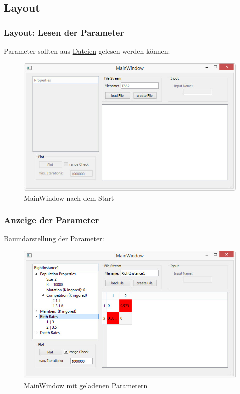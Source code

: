 \documentclass{beamer}
\begin{document}
	\subsection{Layout}
		\begin{frame}
			\frametitle{Layout: Lesen der Parameter}
			Parameter sollten aus \underline{Dateien} gelesen werden können:
			\pause
			\begin{figure}[H]
				\centering
				\includegraphics[width=0.9\linewidth]{./MainWindow_Start}
				\caption[Startwindow]{MainWindow nach dem Start}
				\label{MainWindow_Start}
			\end{figure}
		\end{frame}
		\begin{frame}
			\frametitle{Anzeige der Parameter}
			Baumdarstellung der Parameter:
			\pause
			\begin{figure}[H]
				\centering
				\includegraphics[width=0.9\linewidth]{./MainWindow_ParameterBaum}
				\caption[MainWindow_Parameter]{MainWindow mit geladenen Parametern}
				\label{Baumstruktur}
			\end{figure}
		\end{frame}
\end{document}
